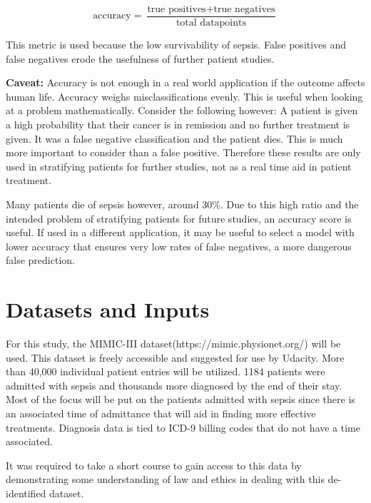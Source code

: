 \documentclass[11pt]{article}
\begin{document}
\[ \text{accuracy} = \frac{\text{true positives} + \text{true negatives}} {\text{total datapoints}} \]



This metric is used because the low survivability of sepsis. False positives and false negatives erode the usefulness of further patient studies.

\textbf{Caveat:} Accuracy is not enough in a real world application if the outcome affects human life. Accuracy weighs misclassifications evenly. This is useful when looking at a problem mathematically. Consider the following however: A patient is given a high probability that their cancer is in remission and no further treatment is given. It was a false negative classification and the patient dies. This is much more important to consider than a false positive. Therefore these results are only used in stratifying patients for further studies, not as a real time aid in patient treatment.

Many patients die of sepsis however, around 30\%. Due to this high ratio and the intended problem of stratifying patients for future studies, an accuracy score is useful. If used in a different application, it may be useful to select a model with lower accuracy that ensures very low rates of false negatives, a more dangerous false prediction.
\section{Datasets and Inputs}
For this study, the MIMIC-III dataset(https://mimic.physionet.org/) will be used. This dataset is freely accessible and suggested for use by Udacity. More than 40,000 individual patient entries will be utilized. 1184 patients were admitted with sepsis and thousands more diagnosed by the end of their stay. Most of the focus will be put on the patients admitted with sepsis since there is an associated time of admittance that will aid in finding more effective treatments. Diagnosis data is tied to ICD-9 billing codes that do not have a time associated.

It was required to take a short course to gain access to this data by demonstrating some understanding of law and ethics in dealing with this de-identified dataset.
\end{document}
